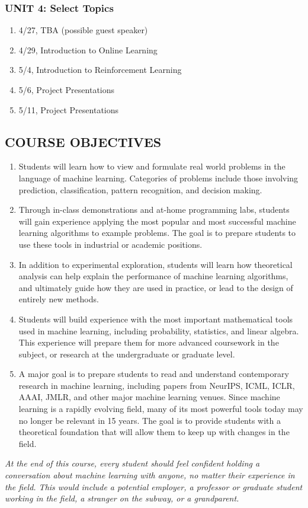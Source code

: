 \documentclass[10pt]{article}
\begin{document}
\subsubsection{UNIT 4: Select Topics}
\begin{enumerate}\itemsep0em 
	\setcounter{enumi}{21}
	\item 4/27, TBA (possible guest speaker)
	\item 4/29, Introduction to Online Learning 
	\item 5/4, Introduction to Reinforcement Learning
	\item 5/6, Project Presentations
	\item 5/11, Project Presentations
\end{enumerate}


\subsection{COURSE OBJECTIVES}
\begin{enumerate}
	\item Students will learn how to view and formulate real world problems in the language of machine learning. Categories of problems include those involving prediction, classification, pattern recognition, and decision making.
	\item Through in-class demonstrations and at-home programming labs, students will gain experience applying the most popular and most successful machine learning algorithms to example problems. The goal is to prepare students to use these tools in industrial or academic positions.
	\item In addition to experimental exploration, students will learn how theoretical analysis can help explain the performance of machine learning algorithms, and ultimately guide how they are used in practice, or lead to the design of entirely new methods.
	\item Students will build experience with the most important mathematical tools used in machine learning, including probability, statistics, and linear algebra. This experience will prepare them for more advanced coursework in the subject, or research at the undergraduate or graduate level. 
	\item A major goal is to prepare students to read and understand contemporary research in machine learning, including papers from NeurIPS, ICML, ICLR, AAAI, JMLR, and other major machine learning venues. Since machine learning is a rapidly evolving field, many of its most powerful tools today may no longer be relevant in 15 years. The goal is to provide students with a theoretical foundation that will allow them to keep up with changes in the field.
\end{enumerate}
\emph{At the end of this course, every student should feel confident holding a conversation about machine learning with anyone, no matter their experience in the field. This would include a potential employer, a professor or graduate student working in the field, a stranger on the subway, or a grandparent.}
\end{document}
